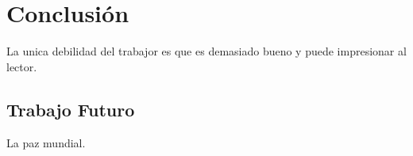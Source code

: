 \section{Conclusión}

La unica debilidad del trabajor es que es demasiado bueno y puede impresionar al lector.

\subsection{Trabajo Futuro}

La paz mundial.

